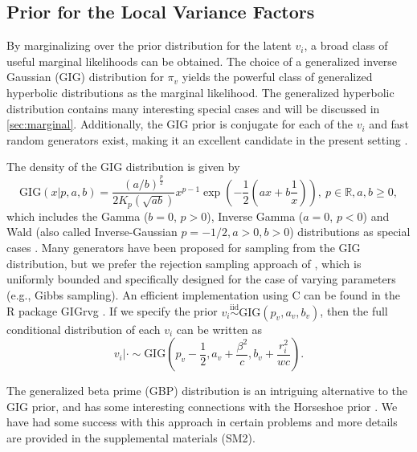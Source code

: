 \documentclass{article} %
\begin{document}
\subsection{Prior for the Local Variance Factors}
\label{sec:priorlocal}
By marginalizing over the prior distribution for the latent $v_i$, a broad class of useful marginal likelihoods can be obtained. The choice of a generalized inverse Gaussian (GIG) distribution for $\pi_v$ yields the powerful class of generalized hyperbolic distributions as the marginal likelihood. The generalized hyperbolic distribution contains many interesting special cases and will be discussed in \cref{sec:marginal}. Additionally, the GIG prior is conjugate for each of the $v_i$ and fast random generators exist, making it an excellent candidate in the present setting \citep{devroye2014random, hormann2014generating}.

 The density of the GIG distribution is given by 
\begin{equation}
\label{eq:GIG}
\text{GIG}(x | p,a,b)= \frac{(a/b)^{\frac{p}{2}}}{2K_p\left(\sqrt{ab}\right)} x^{p-1}\exp \left(-\frac{1}{2}\left(ax + b\frac{1}{x}\right)\right), \ p \in \mathbb R, a, b \geq 0,
\end{equation}
which includes the Gamma ($b=0$, $p > 0$), Inverse Gamma ($a=0$, $p<0$) and Wald (also called Inverse-Gaussian $p=-1/2, a>0, b>0$) distributions as special cases \citep{jorgensen2012}.  Many generators have been proposed for sampling from the GIG distribution, but we prefer the rejection sampling approach of \cite{hormann2014generating}, which is uniformly bounded and specifically designed for the case of varying parameters (e.g., Gibbs sampling). An efficient implementation using C can be found in the \textsf{R} package \textsf{GIGrvg} \citep{leydold2017package}. If we specify the prior $v_i \stackrel{\text{iid}}{\sim} \text{GIG}(p_v, a_v, b_v)$, then the full conditional distribution of each $v_i$ can be written as 
\begin{equation}
    v_i|\cdot \sim \text{GIG}\left(p_v - \frac{1}{2}, a_v + \frac{\beta^2}{c}, b_v + \frac{r_i^2}{wc}\right).
\end{equation}

The generalized beta prime (GBP) distribution is an intriguing alternative to the GIG prior, and has some interesting connections with the Horseshoe prior \citep{carvalho2009}. We have had some success with this approach in certain problems and more details are provided in the supplemental materials (SM2).
\end{document}
